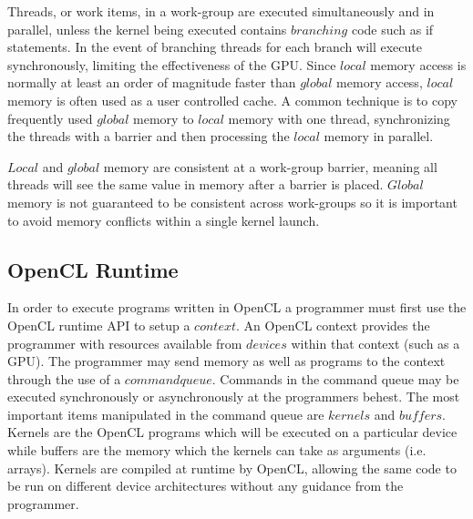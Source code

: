 Threads, or work items, in a work-group are executed simultaneously and in
parallel, unless the kernel being executed contains $branching$ code such as if
statements. In the event of branching threads for each branch will execute
synchronously, limiting the effectiveness of the GPU. Since $local$ memory
access is normally at least an order of magnitude faster than $global$ memory
access, $local$ memory is often used as a user controlled cache. A common
technique is to copy frequently used $global$ memory to $local$ memory with one
thread, synchronizing the threads with a barrier and then processing the
$local$ memory in parallel. 


$Local$ and $global$ memory are consistent at a work-group barrier, meaning all
threads will see the same value in memory after a barrier is placed. $Global$
memory is not guaranteed to be consistent across work-groups so it is important
to avoid memory conflicts within a single kernel launch.

\subsection{OpenCL Runtime}

In order to execute programs written in OpenCL a programmer must first use the
OpenCL runtime API to setup a $context$. An OpenCL context provides the
programmer with resources available from $devices$ within that context (such as
a GPU). The programmer may send memory as well as programs to the context
through the use of a $command queue$. Commands in the command queue may be
executed synchronously or asynchronously at the programmers behest. The most
important items manipulated in the command queue are $kernels$ and $buffers$.
Kernels are the OpenCL programs which will be executed on a particular device
while buffers are the memory which the kernels can take as arguments (i.e.
arrays). Kernels are compiled at runtime by OpenCL, allowing the same code to
be run on different device architectures without any guidance from the
programmer.



